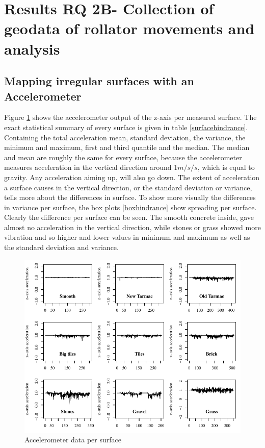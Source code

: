 \section{Results RQ 2B- Collection of geodata of rollator movements and analysis
}
\subsection{Mapping irregular surfaces with an Accelerometer}

Figure \ref{figsurfaces} shows the accelerometer output of the z-axis per measured surface. The exact statistical summary of every surface is given in table \ref{surfacehindrance}. Containing the total acceleration mean, standard deviation, the variance, the minimum and maximum, first and third quantile and the median. The median and mean are roughly the same for every surface, because the accelerometer measures acceleration in the vertical direction around 1$m/s/s$, which is equal to gravity. Any acceleration aiming up, will also go down. The extent of acceleration a surface causes in the vertical direction, or the standard deviation or variance, tells more about the differences in surface.
To show more visually the differences in variance per surface, the box plots \ref{boxhindrance} show spreading per surface. Clearly the difference per surface can be seen. The smooth concrete inside, gave almost no acceleration in the vertical direction, while stones or grass showed more vibration and so higher and lower values in minimum and maximum as well as the standard deviation and variance.   

\begin{figure}[H]
\includegraphics[width=\textwidth]{img/R_AllsurfaceGraphs.pdf}
\centering
\caption[Accelerometer data per surface]{
Accelerometer data per surface\label{figsurfaces}}
\end{figure} 

